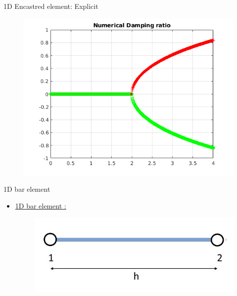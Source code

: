 \begin{frame}{1D Encastred element: Explicit}
\begin{figure}[ht]
\begin{minipage}[b]{0.5\linewidth}
  \end{minipage}%
  \begin{minipage}[b]{0.5\linewidth}
    \centering
    \includegraphics[scale=.35]{images/enc-exp-4.png} \\

  \end{minipage} 
\end{figure}
\end{frame}

\begin{frame}{1D bar element}
\begin{itemize}
\item \underline{1D bar element :}
\begin{figure}
\centering
\includegraphics[width=0.5\linewidth]{images/bar-element.jpg}
\end{figure}
\end{itemize}
\end{frame}

